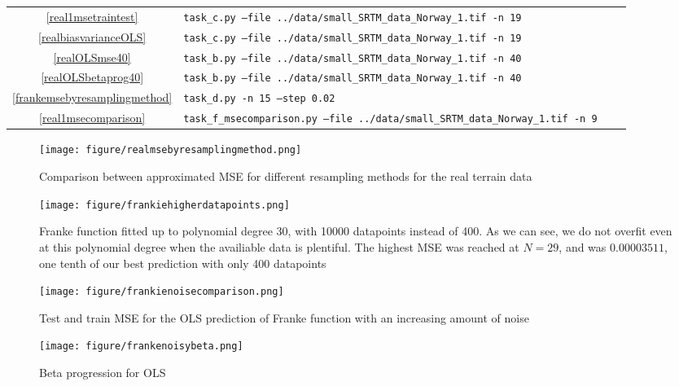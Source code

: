 \documentclass[onecolumn,10pt,cleanfoot]{asme2ej}
\begin{document}
\begin{table*}
\begin{center}
\begin{tabular}{c | l l l}
\ref{real1msetraintest} & \texttt{task\_c.py --file ../data/small\_SRTM\_data\_Norway\_1.tif -n 19}\\
\ref{realbiasvarianceOLS} & \texttt{task\_c.py --file ../data/small\_SRTM\_data\_Norway\_1.tif -n 19}\\
\ref{realOLSmse40} & \texttt{task\_b.py --file ../data/small\_SRTM\_data\_Norway\_1.tif -n 40}\\
\ref{realOLSbetaprog40} & \texttt{task\_b.py --file ../data/small\_SRTM\_data\_Norway\_1.tif -n 40}\\
\ref{frankemsebyresamplingmethod} & \texttt{task\_d.py -n 15 --step 0.02}\\
\ref{real1msecomparison} & \texttt{task\_f\_msecomparison.py --file ../data/small\_SRTM\_data\_Norway\_1.tif -n 9}\\
\hline
\end{tabular}
\end{center}
\end{table*}


\begin{figure*}
\centerline{\texttt{[image: figure/realmsebyresamplingmethod.png]}}
\caption{Comparison between approximated MSE for different resampling methods for the real terrain data}
\label{realmsebyresamplingmethod}
\end{figure*}

\begin{figure*}
\centerline{\texttt{[image: figure/frankiehigherdatapoints.png]}}
\caption{Franke function fitted up to polynomial degree 30, with 10000 datapoints instead of 400. As we can see, we do not overfit even at this polynomial degree when the availiable data is plentiful. The highest MSE was reached at $N=29$, and was $0.00003511$, one tenth of our best prediction with only 400 datapoints}
\label{frankiehigherdatapoints}
\end{figure*}

\begin{figure*}
\centerline{\texttt{[image: figure/frankienoisecomparison.png]}}
\caption{Test and train MSE for the OLS prediction of Franke function with an increasing amount of noise}
\label{frankienoisecomparison}
\end{figure*}

\begin{figure*}
\centerline{\texttt{[image: figure/frankenoisybeta.png]}}
\caption{Beta progression for OLS}
\label{frankenoisybeta}
\end{figure*}
\end{document}

